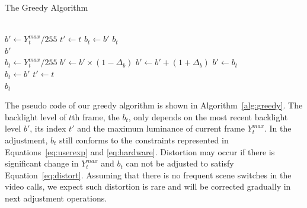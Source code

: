 \begin{algorithm}[t]
  \caption{The Greedy Algorithm}
  \label{alg:greedy}
  \begin{algorithmic}[1]
    \\
      \State $b' \gets Y_{t}^{max} / 255$
      \State $t' \gets t$
      \State $b_t \gets b'$
      \Return $b_t$
    \EndIf
      \\
      \Return $b'$
    \EndIf
    \\

    \State $b_{t} \gets Y_{t}^{max} / 255$
      \State $b' \gets b' \times (1 - \Delta_{b})$
      \State $b' \gets b' + (1 + \Delta_{b})$
    \Else
      \State $b' \gets b_t$
    \EndIf
    \\
    \State $b_{t} \gets b'$
    \State $t' \gets t$\\
    \Return $b_{t}$
  \end{algorithmic}
\end{algorithm}

The pseudo code of our greedy algorithm is shown in
Algorithm~\ref{alg:greedy}. The backlight level of $t$th frame, the
$b_t$, only depends on the most recent backlight level $b'$, its
index $t'$ and the maximum luminance of current frame $Y_t^{max}$. In
the adjustment, $b_t$ still conforms to the constraints represented
in Equations~\ref{eq:userexp} and \ref{eq:hardware}. Distortion may
occur if there is significant change in $Y_t^{max}$ and $b_t$ can not be adjusted to satisfy
Equation~\ref{eq:distort}. Assuming that there is no
frequent scene switches in the video calls, we expect such distortion
is rare and will be
corrected gradually in next adjustment operations. 








